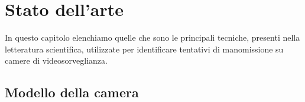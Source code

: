 \chapter{Stato dell'arte}
\label{StatoArte}
\thispagestyle{empty}

\vspace{0.5cm}

\noindent In questo capitolo elenchiamo quelle che sono le principali tecniche, presenti nella letteratura scientifica, utilizzate per identificare tentativi di manomissione su camere di videosorveglianza. 
\section{Modello della camera}

